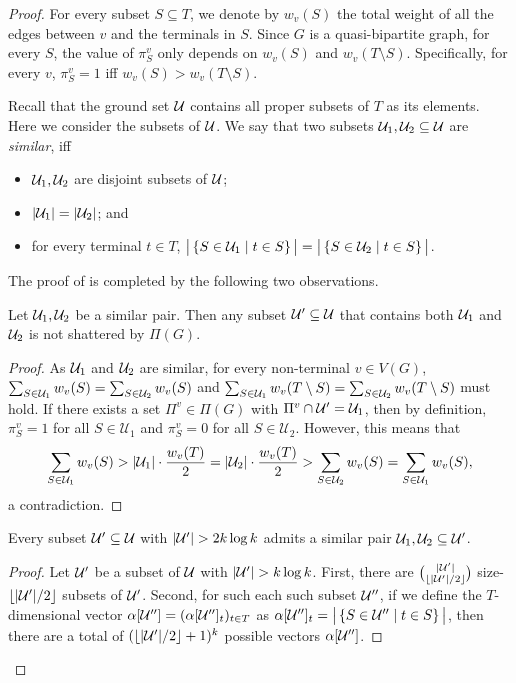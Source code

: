 \begin{proof}
For every subset $S \subseteq T$, we denote by $w_v(S)$ the total weight of all the edges between $v$ and the terminals in $S$. Since $G$ is a quasi-bipartite graph, for every $S$, the value of $\pi^v_S$ only depends on $w_v(S)$ and $w_v(T\setminus S)$. Specifically, for every $v$, $\pi^v_S=1$ iff $w_v(S)>w_v(T\setminus S)$.

Recall that the ground set ${\mathcal U}$ contains all proper subsets of $T$ as its elements. Here we consider the subsets of ${\mathcal U}$. We say that two subsets ${\mathcal U}_1,{\mathcal U}_2\subseteq {\mathcal U}$ are \emph{similar}, iff
\begin{itemize}
\item ${\mathcal U}_1,{\mathcal U}_2$ are disjoint subsets of ${\mathcal U}$;
\item $|{\mathcal U}_1|=|{\mathcal U}_2|$; and
\item for every terminal $t\in T$, $\big|\left\{ S\in {\mathcal U}_1\mid t\in S \right\}\big|=\big|\left\{ S\in {\mathcal U}_2\mid t\in S \right\}\big|$.
\end{itemize}
The proof of  is completed by the following two observations.


\begin{observation}
Let ${\mathcal U}_1,{\mathcal U}_2$ be a similar pair. Then any subset ${\mathcal U}'\subseteq {\mathcal U}$ that contains both ${\mathcal U}_1$ and ${\mathcal U}_2$ is not shattered by $\Pi(G)$.
\end{observation}
\begin{proof}
As ${\mathcal U}_1$ and ${\mathcal U}_2$ are similar, for every non-terminal $v\in V(G)$, $\sum_{S\in {\mathcal U}_1} w_{v}(S) = \sum_{S \in {\mathcal U}_2} w_{v}(S)$ and $\sum_{S \in {\mathcal U}_1} w_v(T \setminus S) = \sum_{S \in {\mathcal U}_2} w_v(T \setminus S)$ must hold. 
If there exists a set $\Pi^v\in \Pi(G)$ with $\Pi^v\cap {\mathcal U}'={\mathcal U}_1$, then by definition,
$\pi^v_S=1$ for all $S \in \mathcal{U}_1$ and $\pi^v_S=0$ for all $S \in \mathcal{U}_2$. 
However, this means that
\[
\sum_{S\in {\mathcal U}_1} w_{v}(S)> |{\mathcal U}_1|\cdot \frac{w_{v}(T)}{2}= |{\mathcal U}_2|\cdot \frac{w_{v}(T)}{2}
> \sum_{S\in {\mathcal U}_2} w_{v}(S) = \sum_{S\in {\mathcal U}_1} w_{v}(S),
\]
a contradiction.
\end{proof}

\begin{observation}
Every subset ${\mathcal U}'\subseteq {\mathcal U}$ with $|\uset'|>2k\log k$ admits a similar pair ${\mathcal U}_1,{\mathcal U}_2\subseteq {\mathcal U}'$.
\end{observation}
\begin{proof}
Let ${\mathcal U}'$ be a subset of ${\mathcal U}$ with $|\uset'|>k\log k$.
First, there are $\binom{|{\mathcal U}'|}{\left\lfloor |{\mathcal U}'|/2 \right\rfloor}$ size-$\left\lfloor |{\mathcal U}'|/2 \right\rfloor$ subsets of ${\mathcal U}'$. Second, for such each such subset ${\mathcal U}''$, if we define the $T$-dimensional vector $\alpha[{\mathcal U}'']=(\alpha[{\mathcal U}'']_t)_{t\in T}$ as
$\alpha[{\mathcal U}'']_t=\big|\left\{ S\in {\mathcal U}''\mid t\in S \right\}\big|$, then there are a total of $(\left\lfloor |{\mathcal U}'|/2 \right\rfloor+1)^k$ possible vectors $\alpha[{\mathcal U}'']$.


\end{proof}
\end{proof}
